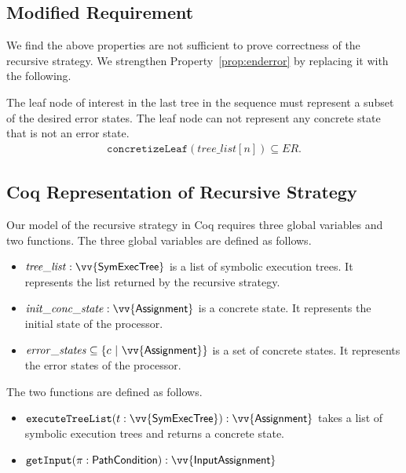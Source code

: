 \subsection{Modified Requirement}
We find the above properties are not sufficient to prove correctness of the
recursive strategy. We strengthen Property~\ref{prop:enderror} by replacing it with the following.

\setcounter{property}{1}
\renewcommand{\theproperty}{Z.\arabic{property}'} 
\begin{property}
  The leaf node of interest in the last tree in the
  sequence must represent a subset of the desired error states. The leaf node
  can not represent any concrete state that is not an error state.
  \label{prop:correctedz2}
  \begin{align*}
    \mathtt{concretizeLeaf}(\mathit{tree\_list}[n]) \subseteq \mathit{ER}.
  \end{align*}

 \end{property}
 
 
\subsection{Coq Representation of Recursive Strategy}
Our model of the recursive strategy in Coq requires three global variables
and two functions. The three global variables are defined as follows.

\begin{itemize}
\item $\mathit{tree\_list} : \vv{\textsf{SymExecTree}}$ is a list of symbolic
  execution trees. It represents the list returned by the recursive strategy.
\item $\mathit{init\_conc\_state} : \vv{\textsf{Assignment}}$ is a concrete
  state. It represents the initial state of the processor.
\item $\mathit{error\_states} \subseteq \{\concstate ~|~
  \vv{\textsf{Assignment}}\}$ is a set of concrete states. It represents the
  error states of the processor.
\end{itemize}

The two functions are defined as follows.
\begin{itemize}
\item $\mathtt{executeTreeList}(t : \vv{\textsf{SymExecTree}}) :
  \vv{\textsf{Assignment}}$ takes a list of symbolic execution trees and
  returns a concrete state.
\item $\mathtt{getInput}(\pi : \textsf{PathCondition}) : \vv{\textsf{InputAssignment}}$
\end{itemize}
  
